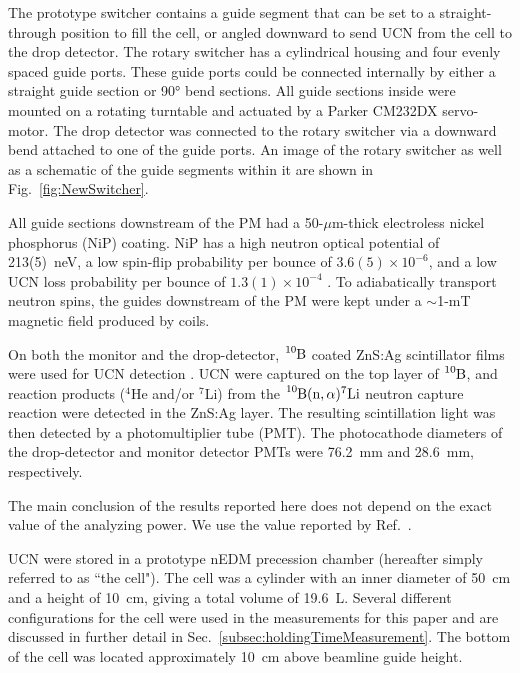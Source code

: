 The prototype switcher contains a guide segment that can be set to a straight-through position to fill the cell, or angled downward to send UCN from the cell to the drop detector. The rotary switcher has a cylindrical housing and four evenly spaced guide ports. These guide ports could be connected internally by either a straight guide section or \ang{90} bend sections. All guide sections inside were mounted on a rotating turntable and actuated by a Parker CM232DX servo-motor. The drop detector was connected to the rotary switcher via a downward bend attached to one of the guide ports. An image of the rotary switcher as well as a schematic of the guide segments within it are shown in Fig.~\ref{fig:NewSwitcher}.

All guide sections downstream of the PM had a 50-${\mu}$m-thick electroless nickel phosphorus (NiP) coating. NiP has a high neutron optical potential of 213(5)~\unit{\nano\eV}, a low spin-flip probability per bounce of $3.6(5) \times 10^{-6}$, and a low UCN loss probability per bounce of $1.3(1) \times 10^{-4}$ \cite{tang_measurement_2016, pattie_jr_evaluation_2017}. To adiabatically transport neutron spins, the guides downstream of the PM were kept under a $\sim$1-mT magnetic field produced by coils.

On both the monitor and the drop-detector, $\ce{^{10}B}$ coated ZnS:Ag scintillator films were used for UCN detection \cite{jeph_b10_2011}. UCN were captured on the top layer of $\ce{^{10}B}$, and reaction products ($^4$He and/or $^7$Li) from the $\ce{^{10}B}(\text{n},\alpha)^7\text{Li}$ neutron capture reaction were detected in the ZnS:Ag layer. The resulting scintillation light was then detected by a photomultiplier tube (PMT). The photocathode diameters of the drop-detector and monitor detector PMTs were \qty{76.2}{\mm} and \qty{28.6}{\mm}, respectively.

The main conclusion of the results reported here does not depend on the exact value of the analyzing power. We use the value reported by Ref.~\cite{ThorstenThesis}.

UCN were stored in a prototype nEDM precession chamber (hereafter simply referred to as ``the cell"). The cell was a cylinder with an inner diameter of \qty{50}{\cm} and a height of \qty{10}{\cm}, giving a total volume of \qty{19.6}{\liter}. Several different configurations for the cell were used in the measurements for this paper and are discussed in further detail in Sec.~\ref{subsec:holdingTimeMeasurement}. The bottom of the cell was located approximately \qty{10}{\cm} above beamline guide height.


